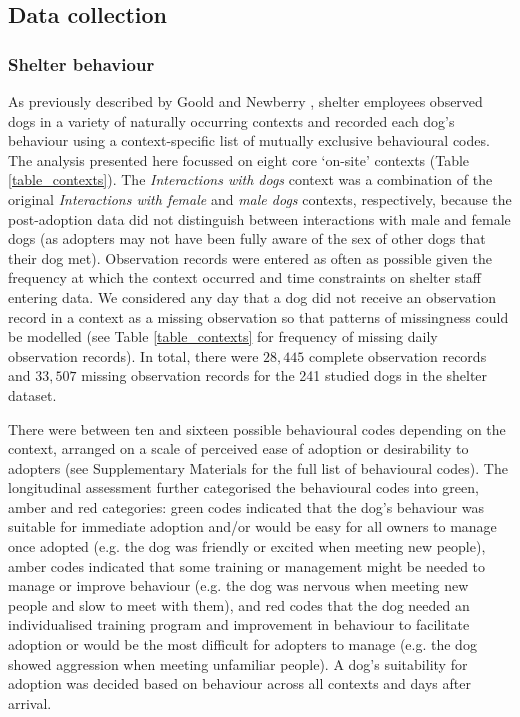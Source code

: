 \documentclass[fleqn,10pt]{wlscirep}
\begin{document}
\subsection*{Data collection}

\subsubsection*{Shelter behaviour}
As previously described by Goold and Newberry \cite{goold2017modelling,goold2017aggressiveness}, shelter employees observed dogs in a variety of naturally occurring contexts and recorded each dog's behaviour using a context-specific list of mutually exclusive behavioural codes. The analysis presented here focussed on eight core ‘on-site' contexts (Table \ref{table_contexts}). The \textit{Interactions with dogs} context was a combination of the original \textit{Interactions with female} and \textit{male dogs} contexts, respectively, because the post-adoption data did not distinguish between interactions with male and female dogs (as adopters may not have been fully aware of the sex of other dogs that their dog met). Observation records were entered as often as possible given the frequency at which the context occurred and time constraints on shelter staff entering data. We considered any day that a dog did not receive an observation record in a context as a missing observation so that patterns of missingness could be modelled (see Table \ref{table_contexts} for frequency of missing daily observation records). In total, there were $28,445$ complete observation records and $33,507$ missing observation records for the 241 studied dogs in the shelter dataset.

There were between ten and sixteen possible behavioural codes depending on the context, arranged on a scale of perceived ease of adoption or desirability to adopters (see Supplementary Materials for the full list of behavioural codes). The longitudinal assessment further categorised the behavioural codes into green, amber and red categories: green codes indicated that the dog's behaviour was suitable for immediate adoption and/or would be easy for all owners to manage once adopted (e.g. the dog was friendly or excited when meeting new people), amber codes indicated that some training or management might be needed to manage or improve behaviour (e.g. the dog was nervous when meeting new people and slow to meet with them), and red codes that the dog needed an individualised training program and improvement in behaviour to facilitate adoption or would be the most difficult for adopters to manage (e.g. the dog showed aggression when meeting unfamiliar people). A dog's suitability for adoption was decided based on behaviour across all contexts and days after arrival.
\end{document}
